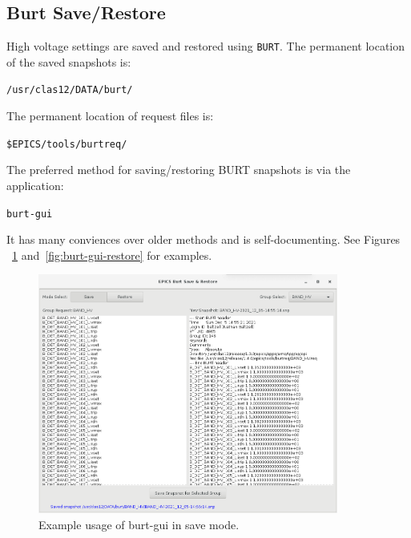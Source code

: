 \documentclass[amsmath,amssymb,notitlepage,11pt]{revtex4}
\begin{document}
\clearpage
\newpage
\begin{appendices}

\section{Burt Save/Restore}\label{sec:burt}
High voltage settings are saved and restored using \texttt{BURT}.  The permanent location of the saved snapshots is: 
\begin{center}\texttt{/usr/clas12/DATA/burt/}\end{center}
The permanent location of request files is:
\begin{center}\texttt{\$EPICS/tools/burtreq/}\end{center}
The preferred method for saving/restoring BURT snapshots is via the application:
\begin{center}\texttt{burt-gui}\end{center}
It has many conviences over older methods and is self-documenting.  See Figures ~\ref{fig:burt-gui-save} and~\ref{fig:burt-gui-restore} for examples.

\begin{figure}[htbp]\centering
  \includegraphics[width=0.88\textwidth]{pics/burt-gui-save}
  \caption{Example usage of burt-gui in save mode.\label{fig:burt-gui-save}}
\end{figure}


\end{appendices}
\end{document}
